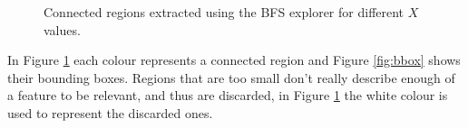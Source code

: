 \documentclass[12pt,a4paper]{article}
\begin{document}
\begin{figure}[!h]
{{		}
		\label{fig:bfs10}
	}
	\quad
	\caption{Connected regions extracted using the BFS explorer for different $X$ values.}
	\label{fig:bfs}
\end{figure}

	In Figure \ref{fig:bfs} each colour represents a connected region and Figure \ref{fig:bbox} shows their bounding boxes. Regions that are too small don't really describe enough of a feature to be relevant, and thus are discarded, in Figure \ref{fig:bfs} the white colour is used to represent the discarded ones.

\newpage
\end{document}
